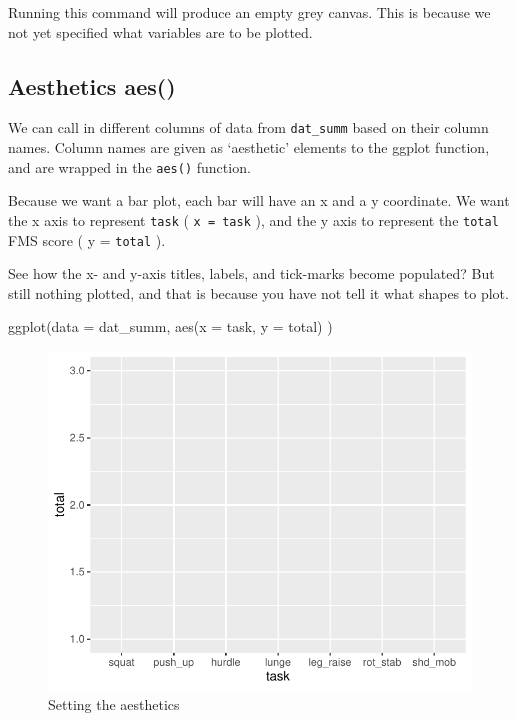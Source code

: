 \documentclass[
]{book}
\newenvironment{Shaded}{\begin{snugshade}}{\end{snugshade}}
\newcommand{\AttributeTok}[1]{\textcolor[rgb]{0.77,0.63,0.00}{#1}}
\newcommand{\FunctionTok}[1]{\textcolor[rgb]{0.00,0.00,0.00}{#1}}
\newcommand{\NormalTok}[1]{#1}
\begin{document}
Running this command will produce an empty grey canvas. This is because we not yet specified what variables are to be plotted.

\hypertarget{BAR-GRAPH-ANATOMY-AES}{%
\subsection{Aesthetics aes()}\label{BAR-GRAPH-ANATOMY-AES}}

We can call in different columns of data from \texttt{dat\_summ} based on their column names. Column names are given as `aesthetic' elements to the ggplot function, and are wrapped in the \texttt{aes()} function.

Because we want a bar plot, each bar will have an x and a y coordinate. We want the x axis to represent \texttt{task} ( \texttt{x\ =\ task} ), and the y axis to represent the \texttt{total} FMS score ( y = \texttt{total} ).

See how the x- and y-axis titles, labels, and tick-marks become populated? But still nothing plotted, and that is because you have not tell it what shapes to plot.

\begin{Shaded}
\begin{Highlighting}[]
\FunctionTok{ggplot}\NormalTok{(}\AttributeTok{data =}\NormalTok{ dat\_summ, }\FunctionTok{aes}\NormalTok{(}\AttributeTok{x =}\NormalTok{ task, }\AttributeTok{y =}\NormalTok{ total) )}
\end{Highlighting}
\end{Shaded}

\begin{figure}

{\centering \includegraphics{se201_stats_book_files/figure-latex/FIG-BAR-GRAPH-AES-1} 

}

\caption[Setting the aesthetics]{Setting the aesthetics}\label{fig:FIG-BAR-GRAPH-AES}
\end{figure}
\end{document}
